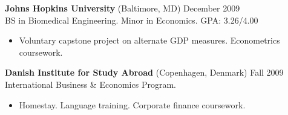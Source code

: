 \documentclass[margin]{res}
\newcommand{\locdatesubsection}[3]{\textbf{#1} (#2) \hfill #3}
\begin{document}
\begin{sloppypar}
\begin{resume}




\locdatesubsection{Johns Hopkins University}{Baltimore, MD}{December 2009}\\
BS in Biomedical Engineering. Minor in Economics. GPA: 3.26/4.00
\begin{itemize}
    \item  Voluntary capstone project on alternate GDP measures. Econometrics coursework.
\end{itemize}

\locdatesubsection{Danish Institute for Study Abroad}{Copenhagen, Denmark}{Fall 2009}\\
International Business \& Economics Program.
\begin{itemize}
    \item Homestay. Language training. Corporate finance coursework.
\end{itemize}


\end{resume}
\end{sloppypar}
\end{document}

